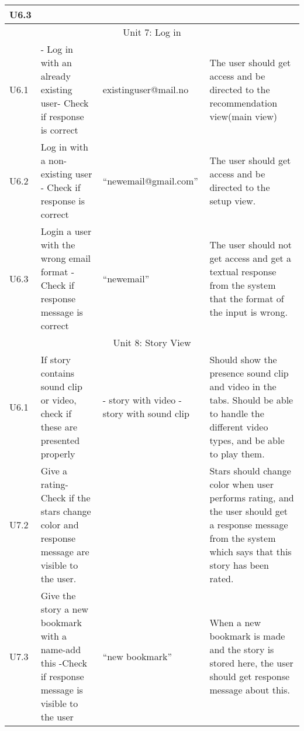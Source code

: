 {\begin{longtable}{ | p{1.5cm} | p{6.5cm} | p{3cm} | p{6.5cm} |}
			U6.3 &  & &  \\ \hline							
					
			\multicolumn{4}{c}{Unit 7: Log in}	\\\hline			
			
			U6.1 & - Log in with an already existing user\newline - Check if response is correct & existinguser@\newline mail.no & The user should get access and be directed to the recommendation view(main view)   \\ \hline			
			
			U6.2 & Log in with a non-existing user \newline - Check if response is correct & “newemail@\newline gmail.com” & The user should get access and be directed to the setup view. \\\hline	
								
			U6.3 &  Login a user with the wrong email format \newline - Check if response message is correct & “newemail” & The user should not get access and get a textual response from the system that the format of the input is wrong. \\ \hline						
			
			\multicolumn{4}{c}{Unit 8: Story View}	\\\hline		
			U6.1 & If story contains sound clip or video, check if these are presented properly & - story with video\newline
			-story with sound clip & Should show the presence sound clip and video in the tabs. Should be able to handle the different video types, and be able to play them.   \\ \hline			
			
			U7.2 & Give a rating\newline - Check if the stars change color and response message are visible to the user.  & & Stars should change color when user performs rating, and the user should get a response message from the system which says that this story has been rated.  \\\hline	
								
			U7.3 & Give the story a new bookmark with a name\newline -add this \newline -Check if response message is visible to the user  & “new bookmark”  & When a new bookmark is made and the story is stored here, the user should get response message about this. \\ \hline	
			

\end{longtable}}
